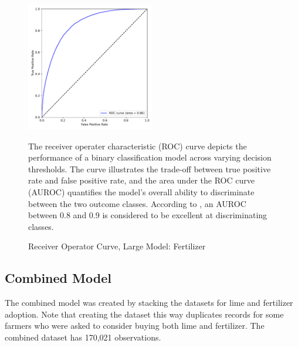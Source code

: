 \documentclass[12pt]{article}
\begin{document}
\begin{figure}[H]
    \centering
    \caption{Receiver Operator Curve, Large Model: Fertilizer}
    \includegraphics[width=0.5\textwidth]{../output/lightgbm_roc_fert.pdf}
    \begin{minipage}{0.6\textwidth}
    \tiny
    The receiver operater characteristic (ROC) curve depicts the performance of a binary classification model across varying decision thresholds. The curve illustrates the trade-off between true positive rate and false positive rate, and the area under the ROC curve (AUROC) quantifies the model's overall ability to discriminate between the two outcome classes. According to \textcite{mandrekar_receiver_2010}, an AUROC between 0.8 and 0.9 is considered to be excellent at discriminating classes.
    \end{minipage}
    \label{fig:roc_fert}
\end{figure}

\subsection{Combined Model}
The combined model was created by stacking the datasets for lime and fertilizer adoption. Note that creating the dataset this way duplicates records for some farmers who were asked to consider buying both lime and fertilizer. The combined dataset has 170,021 observations.
\end{document}
